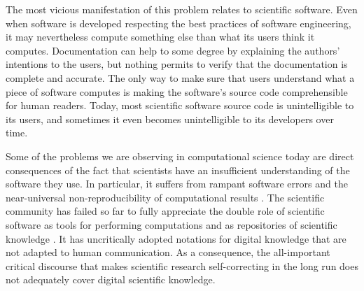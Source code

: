 The most vicious manifestation of this problem relates to scientific software. Even when software is developed respecting the best practices of software engineering, it may nevertheless compute something else than what its users think it computes. Documentation can help to some degree by explaining the authors' intentions to the users, but nothing permits to verify that the documentation is complete and accurate. The only way to make sure that users understand what a piece of software computes is making the software's source code comprehensible for human readers. Today, most scientific software source code is unintelligible to its users, and sometimes it even becomes unintelligible to its developers over time.

Some of the problems we are observing in computational science today are direct consequences of the fact that scientists have an insufficient understanding of the software they use. In particular, it suffers from rampant software errors \cite{soergel_rampant_2014,merali_computational_2010} and the near-universal non-reproducibility of computational results \cite{stodden_setting_2013,peng_reproducible_2011}. The scientific community has failed so far to fully appreciate the double role of scientific software as tools for performing computations and as repositories of scientific knowledge \cite{hinsen_computational_2014}. It has uncritically adopted notations for digital knowledge that are not adapted to human communication. As a consequence, the all-important critical discourse that makes scientific research self-correcting in the long run does not adequately cover digital scientific knowledge.

